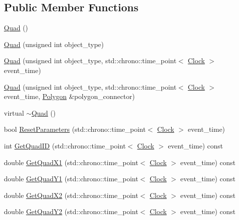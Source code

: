 \subsection*{Public Member Functions}
\begin{DoxyCompactItemize}
\item 
\hyperlink{class_quad_ae446d188d645cc5c512336f25d1a697a}{Quad} ()
\item 
\hyperlink{class_quad_a8a0b4e52a52ac35a4a78fac3a0cd36b8}{Quad} (unsigned int object\+\_\+type)
\item 
\hyperlink{class_quad_aa22093808d9a84db2bf826ccacee415e}{Quad} (unsigned int object\+\_\+type, std\+::chrono\+::time\+\_\+point$<$ \hyperlink{universe_8h_a0ef8d951d1ca5ab3cfaf7ab4c7a6fd80}{Clock} $>$ event\+\_\+time)
\item 
\hyperlink{class_quad_a4bb08fd4d953ce61076ed06b51ee2793}{Quad} (unsigned int object\+\_\+type, std\+::chrono\+::time\+\_\+point$<$ \hyperlink{universe_8h_a0ef8d951d1ca5ab3cfaf7ab4c7a6fd80}{Clock} $>$ event\+\_\+time, \hyperlink{class_polygon}{Polygon} \&polygon\+\_\+connector)
\item 
virtual \hyperlink{class_quad_a64a53d5b7a7811c34a85054828f74866}{$\sim$\+Quad} ()
\item 
bool \hyperlink{class_quad_af7c18022d7db1ad20bb7a1e1bd1ffb90}{Reset\+Parameters} (std\+::chrono\+::time\+\_\+point$<$ \hyperlink{universe_8h_a0ef8d951d1ca5ab3cfaf7ab4c7a6fd80}{Clock} $>$ event\+\_\+time)
\item 
int \hyperlink{class_quad_aba78e3b63f568529fcae1cfa6c3c54bf}{Get\+Quad\+ID} (std\+::chrono\+::time\+\_\+point$<$ \hyperlink{universe_8h_a0ef8d951d1ca5ab3cfaf7ab4c7a6fd80}{Clock} $>$ event\+\_\+time) const
\item 
double \hyperlink{class_quad_a7b0e34a18832713528b861f7ed35e139}{Get\+Quad\+X1} (std\+::chrono\+::time\+\_\+point$<$ \hyperlink{universe_8h_a0ef8d951d1ca5ab3cfaf7ab4c7a6fd80}{Clock} $>$ event\+\_\+time) const
\item 
double \hyperlink{class_quad_ac7b0d27994149531dcd81eacca4e1a5c}{Get\+Quad\+Y1} (std\+::chrono\+::time\+\_\+point$<$ \hyperlink{universe_8h_a0ef8d951d1ca5ab3cfaf7ab4c7a6fd80}{Clock} $>$ event\+\_\+time) const
\item 
double \hyperlink{class_quad_a2974623eaf17fe5bef35e8c4638149d6}{Get\+Quad\+X2} (std\+::chrono\+::time\+\_\+point$<$ \hyperlink{universe_8h_a0ef8d951d1ca5ab3cfaf7ab4c7a6fd80}{Clock} $>$ event\+\_\+time) const
\item 
double \hyperlink{class_quad_a8f10730993f6c6310f18431a81fb352a}{Get\+Quad\+Y2} (std\+::chrono\+::time\+\_\+point$<$ \hyperlink{universe_8h_a0ef8d951d1ca5ab3cfaf7ab4c7a6fd80}{Clock} $>$ event\+\_\+time) const

\end{DoxyCompactItemize}
